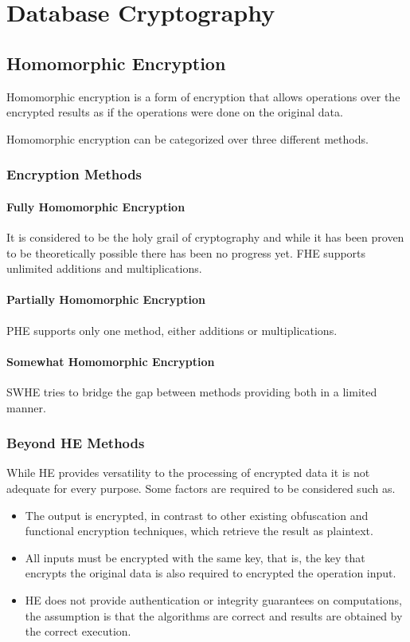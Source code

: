 \section{Database Cryptography}
\subsection{Homomorphic Encryption}

Homomorphic encryption is a form of encryption that allows operations over the encrypted results
as if the operations were done on the original data.

Homomorphic encryption can be categorized over three different methods.

\subsubsection{Encryption Methods}

\paragraph{Fully Homomorphic Encryption}
It is considered to be the holy grail of cryptography and while it has been proven to be theoretically possible there has been no progress yet.
FHE supports unlimited additions and multiplications.

\paragraph{Partially Homomorphic Encryption}
PHE supports only one method, either additions or multiplications.

\paragraph{Somewhat Homomorphic Encryption}
SWHE tries to bridge the gap between methods providing both in a limited manner.

\subsubsection{Beyond HE Methods}
While HE provides versatility to the processing of encrypted data it is not adequate for every purpose.
Some factors are required to be considered such as.
\begin{itemize}
    \item The output is encrypted,
    in contrast to other existing obfuscation and functional encryption techniques,
    which retrieve the result as plaintext.
    \item All inputs must be encrypted with the same key,
    that is, the key that encrypts the original data is also required to encrypted the operation input.
    \item HE does not provide authentication or integrity guarantees on computations,
    the assumption is that the algorithms are correct and results are obtained by the correct execution.
\end{itemize}

